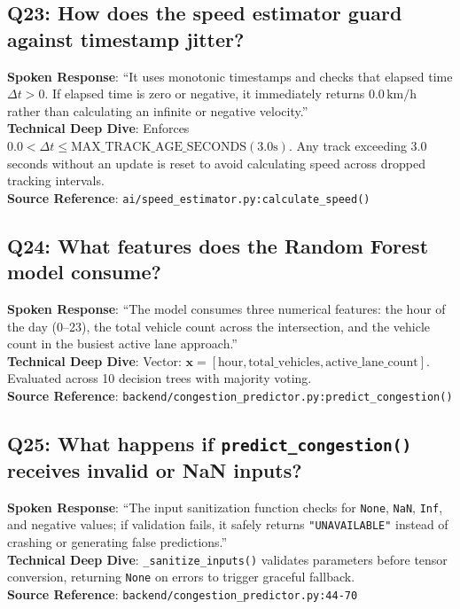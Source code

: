 \subsection*{Q23: How does the speed estimator guard against timestamp jitter?}
\begin{interviewbox}
\textbf{Spoken Response}: ``It uses monotonic timestamps and checks that elapsed time $\Delta t > 0$. If elapsed time is zero or negative, it immediately returns $0.0\,\text{km/h}$ rather than calculating an infinite or negative velocity.''\\
\textbf{Technical Deep Dive}: Enforces $0.0 < \Delta t \le \text{MAX\_TRACK\_AGE\_SECONDS} (3.0\text{s})$. Any track exceeding 3.0 seconds without an update is reset to avoid calculating speed across dropped tracking intervals.\\
\textbf{Source Reference}: \texttt{ai/speed\_estimator.py:calculate\_speed()}
\end{interviewbox}

\subsection*{Q24: What features does the Random Forest model consume?}
\begin{interviewbox}
\textbf{Spoken Response}: ``The model consumes three numerical features: the hour of the day (0--23), the total vehicle count across the intersection, and the vehicle count in the busiest active lane approach.''\\
\textbf{Technical Deep Dive}: Vector: $\mathbf{x} = [\text{hour}, \text{total\_vehicles}, \text{active\_lane\_count}]$. Evaluated across 10 decision trees with majority voting.\\
\textbf{Source Reference}: \texttt{backend/congestion\_predictor.py:predict\_congestion()}
\end{interviewbox}

\subsection*{Q25: What happens if \texttt{predict\_congestion()} receives invalid or NaN inputs?}
\begin{interviewbox}
\textbf{Spoken Response}: ``The input sanitization function checks for \texttt{None}, \texttt{NaN}, \texttt{Inf}, and negative values; if validation fails, it safely returns \texttt{"UNAVAILABLE"} instead of crashing or generating false predictions.''\\
\textbf{Technical Deep Dive}: \texttt{\_sanitize\_inputs()} validates parameters before tensor conversion, returning \texttt{None} on errors to trigger graceful fallback.\\
\textbf{Source Reference}: \texttt{backend/congestion\_predictor.py:44-70}
\end{interviewbox}

